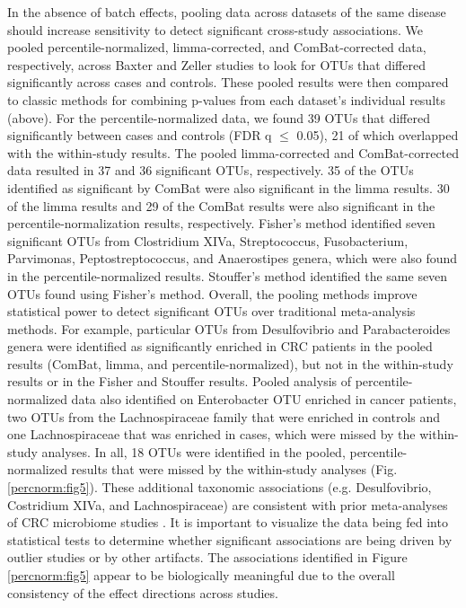In the absence of batch effects, pooling data across datasets of the same disease should increase sensitivity to detect significant cross-study associations.
We pooled percentile-normalized, limma-corrected, and ComBat-corrected data, respectively, across Baxter and Zeller studies to look for OTUs that differed significantly across cases and controls.
These pooled results were then compared to classic methods for combining p-values from each dataset's individual results (above).
For the percentile-normalized data, we found 39 OTUs that differed significantly between cases and controls (FDR q $\leq$ 0.05), 21 of which overlapped with the within-study results.
The pooled limma-corrected and ComBat-corrected data resulted in 37 and 36 significant OTUs, respectively.
35 of the OTUs identified as significant by ComBat were also significant in the limma results.
30 of the limma results and 29 of the ComBat results were also significant in the percentile-normalization results, respectively.
Fisher's method identified seven significant OTUs from Clostridium XIVa, Streptococcus, Fusobacterium, Parvimonas, Peptostreptococcus, and Anaerostipes genera, which were also found in the percentile-normalized results.
Stouffer's method identified the same seven OTUs found using Fisher's method.
Overall, the pooling methods improve statistical power to detect significant OTUs over traditional meta-analysis methods.
For example, particular OTUs from Desulfovibrio and Parabacteroides genera were identified as significantly enriched in CRC patients in the pooled results (ComBat, limma, and percentile-normalized), but not in the within-study results or in the Fisher and Stouffer results.
Pooled analysis of percentile-normalized data also identified on Enterobacter OTU enriched in cancer patients, two OTUs from the Lachnospiraceae family that were enriched in controls and one Lachnospiraceae that was enriched in cases, which were missed by the within-study analyses.
In all, 18 OTUs were identified in the pooled, percentile-normalized results that were missed by the within-study analyses (Fig. \ref{percnorm:fig5}).
These additional taxonomic associations (e.g. Desulfovibrio, Costridium XIVa, and Lachnospiraceae) are consistent with prior meta-analyses of CRC microbiome studies \cite{17,43}.
It is important to visualize the data being fed into statistical tests to determine whether significant associations are being driven by outlier studies or by other artifacts.
The associations identified in Figure \ref{percnorm:fig5} appear to be biologically meaningful due to the overall consistency of the effect directions across studies.

